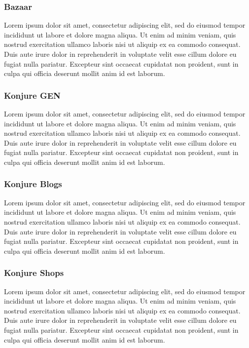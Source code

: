 \documentclass{article}
\newcommand\tab[1][1cm]{\hspace*{#1}}
\begin{document}
\subsubsection{Bazaar}

\tab Lorem ipsum dolor sit amet, consectetur adipiscing elit, sed do eiusmod tempor incididunt ut labore et dolore magna aliqua. Ut enim ad minim veniam, quis nostrud exercitation ullamco laboris nisi ut aliquip ex ea commodo consequat. Duis aute irure dolor in reprehenderit in voluptate velit esse cillum dolore eu fugiat nulla pariatur. Excepteur sint occaecat cupidatat non proident, sunt in culpa qui officia deserunt mollit anim id est laborum.

\subsubsection{Konjure GEN}

\tab Lorem ipsum dolor sit amet, consectetur adipiscing elit, sed do eiusmod tempor incididunt ut labore et dolore magna aliqua. Ut enim ad minim veniam, quis nostrud exercitation ullamco laboris nisi ut aliquip ex ea commodo consequat. Duis aute irure dolor in reprehenderit in voluptate velit esse cillum dolore eu fugiat nulla pariatur. Excepteur sint occaecat cupidatat non proident, sunt in culpa qui officia deserunt mollit anim id est laborum.

\subsubsection{Konjure Blogs}

\tab Lorem ipsum dolor sit amet, consectetur adipiscing elit, sed do eiusmod tempor incididunt ut labore et dolore magna aliqua. Ut enim ad minim veniam, quis nostrud exercitation ullamco laboris nisi ut aliquip ex ea commodo consequat. Duis aute irure dolor in reprehenderit in voluptate velit esse cillum dolore eu fugiat nulla pariatur. Excepteur sint occaecat cupidatat non proident, sunt in culpa qui officia deserunt mollit anim id est laborum.

\subsubsection{Konjure Shops}

\tab Lorem ipsum dolor sit amet, consectetur adipiscing elit, sed do eiusmod tempor incididunt ut labore et dolore magna aliqua. Ut enim ad minim veniam, quis nostrud exercitation ullamco laboris nisi ut aliquip ex ea commodo consequat. Duis aute irure dolor in reprehenderit in voluptate velit esse cillum dolore eu fugiat nulla pariatur. Excepteur sint occaecat cupidatat non proident, sunt in culpa qui officia deserunt mollit anim id est laborum.
\end{document}
